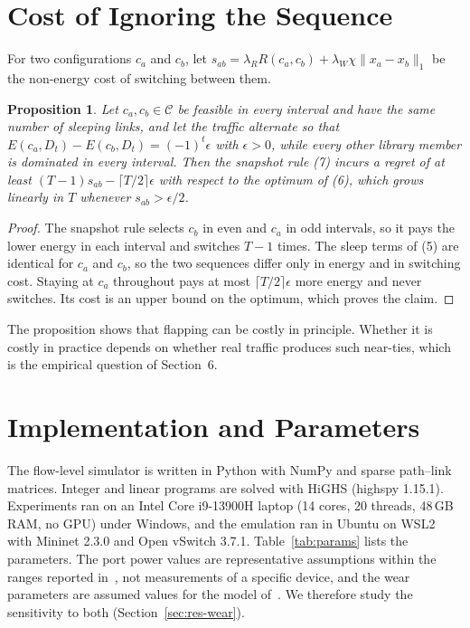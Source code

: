 \documentclass[preprint,12pt]{elsarticle}
\newtheorem{proposition}{Proposition}
\begin{document}
\section{Cost of Ignoring the Sequence}

For two configurations $c_a$ and $c_b$, let $s_{ab}=\lambda_R R(c_a,c_b)+\lambda_W\chi\|x_a-x_b\|_1$ be the non-energy cost of switching between them.

\begin{proposition}\label{prop:snapshot}
Let $c_a,c_b\in\mathcal{C}$ be feasible in every interval and have the same number of sleeping links, and let the traffic alternate so that $E(c_a,D_t)-E(c_b,D_t)=(-1)^t\epsilon$ with $\epsilon>0$, while every other library member is dominated in every interval. Then the snapshot rule (7) incurs a regret of at least $(T-1)s_{ab}-\lceil T/2\rceil\epsilon$ with respect to the optimum of (6), which grows linearly in $T$ whenever $s_{ab}>\epsilon/2$.
\end{proposition}
\begin{proof}
The snapshot rule selects $c_b$ in even and $c_a$ in odd intervals, so it pays the lower energy in each interval and switches $T-1$ times. The sleep terms of (5) are identical for $c_a$ and $c_b$, so the two sequences differ only in energy and in switching cost. Staying at $c_a$ throughout pays at most $\lceil T/2\rceil\epsilon$ more energy and never switches. Its cost is an upper bound on the optimum, which proves the claim.
\end{proof}

The proposition shows that flapping can be costly in principle. Whether it is costly in practice depends on whether real traffic produces such near-ties, which is the empirical question of Section~6.



\section{Implementation and Parameters}\label{sec:params}

The flow-level simulator is written in Python with NumPy and sparse path--link matrices. Integer and linear programs are solved with HiGHS (highspy 1.15.1). Experiments ran on an Intel Core i9-13900H laptop (14 cores, 20 threads, 48\,GB RAM, no GPU) under Windows, and the emulation ran in Ubuntu on WSL2 with Mininet 2.3.0 and Open vSwitch 3.7.1. Table~\ref{tab:params} lists the parameters. The port power values are representative assumptions within the ranges reported in~\cite{vishwanath2014modeling,mahadevan2009power}, not measurements of a specific device, and the wear parameters are assumed values for the model of~\cite{chiaraviglio2015lifetime}. We therefore study the sensitivity to both (Section~\ref{sec:res-wear}).
\end{document}
